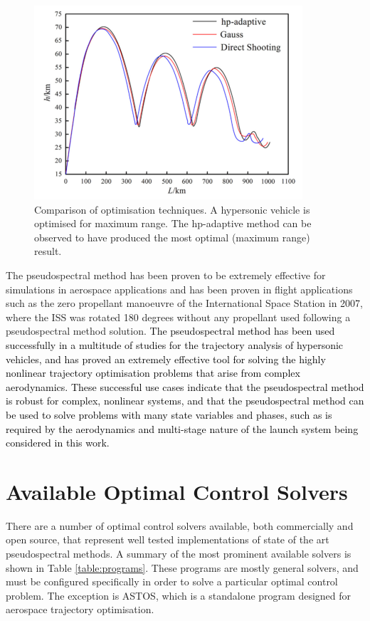 \begin{figure}[ht]
	\centering
	\includegraphics[width=0.7\linewidth]{figures/2_literature-review/OptimisationMethodComparisonChai}
	\caption{Comparison of optimisation techniques\cite{Chai2015}. A hypersonic vehicle is optimised for maximum range. The \textsf{hp}-adaptive method can be observed to have produced the most optimal (maximum range) result.}
	\label{fig:OptimisationMethodComparisonChai}
\end{figure}

The pseudospectral method has been proven to be extremely effective for simulations in aerospace applications and has been proven in flight applications such as the zero propellant manoeuvre of the International Space Station in 2007, where the ISS was rotated 180 degrees without any propellant used following a pseudospectral method solution\cite{Bedrossian}. 
\textcolor{black}{
The pseudospectral method has been used successfully in a multitude of studies for the trajectory analysis of hypersonic vehicles\cite{Li2012,Josselyn2002a,Zhao2013,Tian2011,Darby2011,Chai2015,Rizvi2015,Moshman2014,Yang2017,Kodera2014}, and has proved an extremely effective tool for solving the highly nonlinear trajectory optimisation problems that arise from complex aerodynamics. 
These successful use cases indicate that the pseudospectral method is robust for complex, nonlinear systems, and that the pseudospectral method can be used to solve problems with many state variables and phases, such as is required by the aerodynamics and multi-stage nature of the launch system being considered in this work.
}
\section{Available Optimal Control Solvers}\label{sec:optsolvers}

There are a number of optimal control solvers available, both commercially and open source, that represent well tested implementations of state of the art pseudospectral methods. A summary of the most prominent available solvers is shown in Table \ref{table:programs}. These programs are mostly general solvers, and must be configured specifically in order to solve a particular optimal control problem. The exception is ASTOS\cite{astos}, which is a standalone program designed for aerospace trajectory optimisation.

